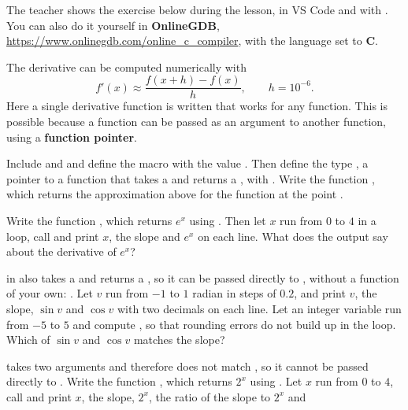 The teacher shows the exercise below during the lesson, in VS Code and with . You can
also do it yourself in \textbf{OnlineGDB}, \url{https://www.onlinegdb.com/online_c_compiler}, with
the language set to \textbf{C}.

The derivative can be computed numerically with
\[
  f'(x) \approx \frac{f(x + h) - f(x)}{h}, \qquad h = 10^{-6}.
\]
Here a single derivative function is written that works for any function. This is possible
because a function can be passed as an argument to another function, using a
\textbf{function pointer}.
\begin{parts}
  \item Include  and  and define the macro  with the
    value . Then define the type , a pointer to a function that takes
    a  and returns a , with
    . Write the function
    , which returns the approximation above for the
    function  at the point .
  \item Write the function , which returns $e^x$ using
    . Then let $x$ run from $0$ to $4$ in a loop, call  and
    print $x$, the slope and $e^x$ on each line. What does the output say about the derivative of
    $e^x$?
  \item {} in  also takes a  and returns a , so it
    can be passed directly to , without a function of your own:
    . Let $v$ run from $-1$ to $1$ radian in steps of $0.2$, and print $v$,
    the slope, $\sin v$ and $\cos v$ with two decimals on each line. Let an integer variable
     run from $-5$ to $5$ and compute , so that rounding errors do not
    build up in the loop. Which of $\sin v$ and $\cos v$ matches the slope?
  \item {} takes two arguments and therefore does not match , so it
    cannot be passed directly to . Write the function ,
    which returns $2^x$ using . Let $x$ run from $0$ to $4$, call
     and print $x$, the slope, $2^x$, the ratio of the slope to $2^x$ and

\end{parts}
